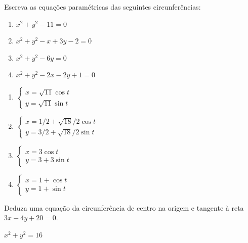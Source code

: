 \documentclass[12pt]{exam}
\begin{document}
\begin{exercicio}
    Escreva as equações paramétricas das seguintes circunferências:
    \begin{enumerate}[label=({\alph*})]
        \item $x^2 + y^2 - 11 = 0$
        \item $x^2 + y^2 - x + 3y - 2 = 0$
        \item $x^2 + y^2 - 6y = 0$
        \item $x^2 + y^2 - 2x - 2y + 1 = 0$
    \end{enumerate}
    \begin{solucao}
        \begin{enumerate}[label=({\alph*})]
            \item $\begin{cases}
                          x = \sqrt{11}\cos t \\
                          y = \sqrt{11}\sin t
                      \end{cases}$
            \item $\begin{cases}
                          x = 1/2 + \sqrt{18}/2\cos t \\
                          y = 3/2 + \sqrt{18}/2\sin t
                      \end{cases}$
            \item $\begin{cases}
                          x = 3\cos t \\
                          y = 3 + 3\sin t
                      \end{cases}$
            \item $\begin{cases}
                          x = 1 + \cos t \\
                          y = 1 + \sin t
                      \end{cases}$
        \end{enumerate}
    \end{solucao}
\end{exercicio}

\begin{exercicio}
    Deduza uma equação da circunferência  de centro na origem e tangente à reta $3x - 4y + 20 = 0$.
    \begin{solucao}
        $x^2 + y^2 = 16$
    \end{solucao}
\end{exercicio}
\end{document}
